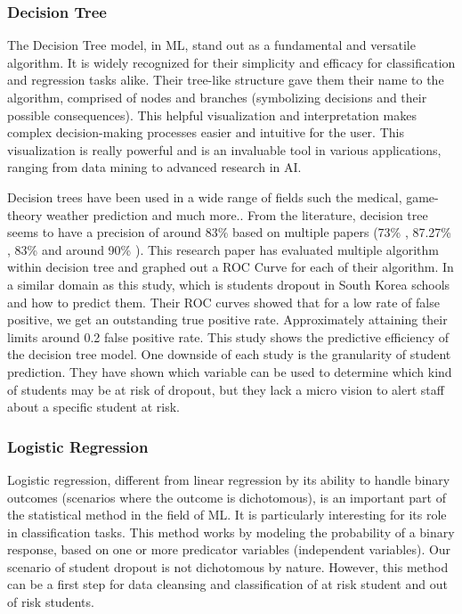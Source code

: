 \documentclass[conference]{IEEEtran}
\begin{document}
\vspace{8pt}
\subsubsection{Decision Tree}
The Decision Tree model, in ML, stand out as a fundamental and versatile algorithm. It is widely recognized for their simplicity and efficacy for classification and regression tasks alike.
Their tree-like structure gave them their name to the algorithm, comprised of nodes and branches (symbolizing decisions and their possible consequences). This helpful visualization and interpretation makes complex decision-making processes easier and intuitive for the user. This visualization is really powerful and is an invaluable tool in various applications, ranging from data mining to advanced research in AI.

Decision trees have been used in a wide range of fields such the medical, game-theory weather prediction and much more.\cite{quinlan_induction_1986}.
From the literature, decision tree seems to have a precision of around 83\% based on multiple papers (73\% \cite{viloria_integration_2019}, 87.27\% \cite{ramirez_prediction_2018}, 83\%\cite{kemper_predicting_2020} and around 90\% \cite{tenpipat_student_2020}). This research paper has evaluated multiple algorithm within decision tree and graphed out a ROC Curve for each of their algorithm. In a similar domain as this study, which is students dropout in South Korea schools and how to predict them. Their ROC curves showed that for a low rate of false positive, we get an outstanding true positive rate. Approximately attaining their limits around 0.2 false positive rate\cite{lee_machine_2019}. This study shows the predictive efficiency of the decision tree model. 
One downside of each study is the granularity of student prediction. They have shown which variable can be used to determine which kind of students may be at risk of dropout, but they lack a micro vision to alert staff about a specific student at risk.

\vspace{8pt}
\subsubsection{Logistic Regression}
Logistic regression, different from linear regression by its ability to handle binary outcomes (scenarios where the outcome is dichotomous), is an important part of the statistical method in the field of ML. It is particularly interesting for its role in classification tasks. This method works by modeling the probability of a binary response, based on one or more predicator variables (independent variables). 
Our scenario of student dropout is not dichotomous by nature. However, this method can be a first step for data cleansing and classification of at risk student and out of risk students.
\end{document}
